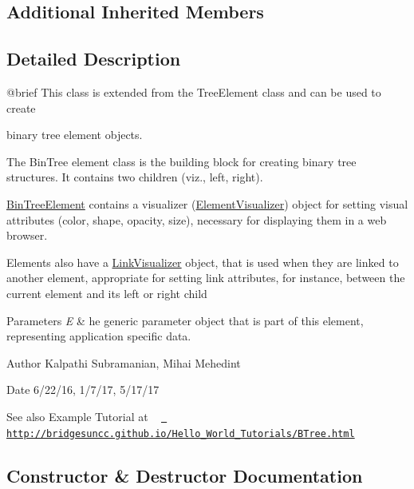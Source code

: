 \subsection*{Additional Inherited Members}


\subsection{Detailed Description}
\begin{DoxyVerb}@brief This class is extended from the TreeElement class  and can be used to create
\end{DoxyVerb}
 binary tree element objects.

The Bin\+Tree element class is the building block for creating binary tree structures. It contains two children (viz., left, right).

\mbox{\hyperlink{classbridges_1_1base_1_1_bin_tree_element}{Bin\+Tree\+Element}} contains a visualizer (\mbox{\hyperlink{classbridges_1_1base_1_1_element_visualizer}{Element\+Visualizer}}) object for setting visual attributes (color, shape, opacity, size), necessary for displaying them in a web browser.

Elements also have a \mbox{\hyperlink{classbridges_1_1base_1_1_link_visualizer}{Link\+Visualizer}} object, that is used when they are linked to another element, appropriate for setting link attributes, for instance, between the current element and its left or right child


\begin{DoxyParams}{Parameters}
{\em E} & he generic parameter object that is part of this element, representing application specific data.\\
\hline
\end{DoxyParams}
\begin{DoxyAuthor}{Author}
Kalpathi Subramanian, Mihai Mehedint
\end{DoxyAuthor}
\begin{DoxyDate}{Date}
6/22/16, 1/7/17, 5/17/17
\end{DoxyDate}
\begin{DoxySeeAlso}{See also}
Example Tutorial at ~\newline
 \href{http://bridgesuncc.github.io/Hello_World_Tutorials/BTree.html}{\texttt{ http\+://bridgesuncc.\+github.\+io/\+Hello\+\_\+\+World\+\_\+\+Tutorials/\+B\+Tree.\+html}} 
\end{DoxySeeAlso}


\subsection{Constructor \& Destructor Documentation}
\mbox{\label{classbridges_1_1base_1_1_bin_tree_element_ad6dbf38d53a78be561039c46bde8bc47}} 
